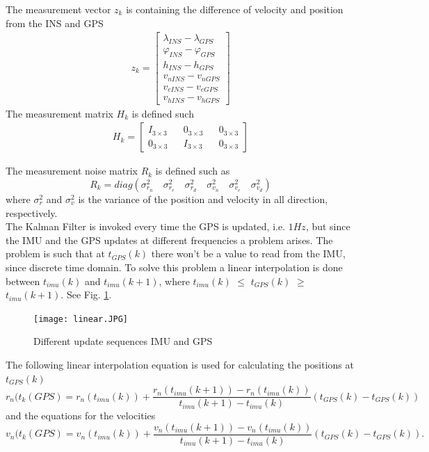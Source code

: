 The measurement vector $z_k$ is containing the difference of velocity and position from the INS and GPS
\begin{align}
z_k =
\begin{bmatrix}
\lambda_{INS} - \lambda_{GPS} \\
\varphi_{INS} - \varphi_{GPS} \\
h_{INS} - h_{GPS} \\
v_{nINS} - v_{nGPS} \\
v_{eINS} - v_{eGPS} \\
v_{hINS} - v_{hGPS}
\end{bmatrix}
\end{align}
The measurement matrix $H_k$ is defined such
\begin{align}
H_k = 
\begin{bmatrix}
I_{3\times 3} && 0_{3 \times 3} && 0_{3 \times 3} \\
0_{3 \times 3} && I_{3\times 3} && 0_{3 \times 3}
\end{bmatrix}
\end{align}

The measurement noise matrix $R_k$ is defined such as 
\begin{equation}
R_k = diag(\sigma_{r_n}^2 \quad \sigma_{r_e}^2 \quad \sigma_{r_d}^2 \quad \sigma_{v_n}^2 \quad \sigma_{v_e}^2 \quad \sigma_{v_d}^2)
\end{equation}
where $\sigma_{r}^2$ and $\sigma_{v}^2$ is the variance of the position and velocity in all direction, respectively.\\

The Kalman Filter is invoked every time the GPS is updated, i.e. $1Hz$, but since the IMU and the GPS updates at different frequencies a problem arises. The problem is such that at $t_{GPS}(k)$ there won't be a value to read from the IMU, since discrete time domain. To solve this problem a linear interpolation is done between $t_{imu}(k)$ and $t_{imu}(k+1)$, where $t_{imu}(k)$ $\leq$ $t_{GPS}(k)$ $\geq$  $t_{imu}(k+1)$. See Fig. \ref{Fig.different_update}.
\begin{figure}[H]
\centering
\texttt{[image: linear.JPG]}
\caption{Different update sequences IMU and GPS}
\label{Fig.different_update}
\end{figure}

The following linear interpolation equation is used for calculating the positions at $t_{GPS}(k)$
\begin{equation}
r_n(t_k(GPS) = r_n(t_{imu}(k)) + \frac{r_n(t_{imu}(k+1))-r_n(t_{imu}(k))}{t_{imu}(k+1)-t_{imu}(k)}(t_{GPS}(k)-t_{GPS}(k))
\end{equation}
 and the equations for the velocities 
 \begin{equation}
v_n(t_k(GPS) = v_n(t_{imu}(k)) + \frac{v_n(t_{imu}(k+1))-v_n(t_{imu}(k))}{t_{imu}(k+1)-t_{imu}(k)}(t_{GPS}(k)-t_{GPS}(k)).
\end{equation}









